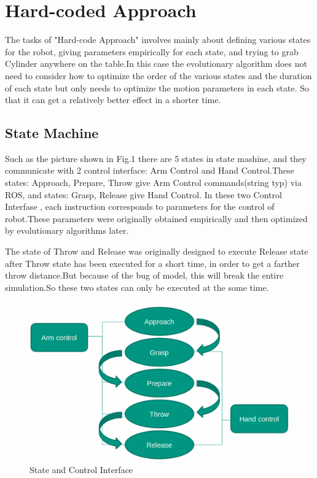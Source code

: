 \section{Hard-coded Approach}

The tasks of "Hard-code Approach" involves mainly about defining various states for the robot, giving parameters empirically for each state, and trying to grab Cylinder anywhere on the table.In this case the evolutionary algorithm does not need to consider how to optimize the order of the various states and the duration of each state but only needs to optimize the motion parameters in each state. So that it can get a relatively better effect in a shorter time.

\subsection{State Machine}

Such as the picture shown in Fig.1 there are 5 states in state mashine, and they communicate with 2 control interface: Arm Control and Hand Control.These states: Approach, Prepare, Throw give Arm Control commands(string typ) via ROS, and states: Grasp, Release give Hand Control. In these two Control Interfase , each instruction corresponds to parameters for the control of robot.These parameters were originally obtained empirically and then optimized by evolutionary algorithms later. 

The state of Throw and Release was originally designed to execute Release state after Throw state has been executed for a short time, in order to get a farther throw distance.But because of the bug of model, this will break the entire simulation.So these two states can only be executed at the some time. 

\begin{figure}[tpb]
\centering
	\includegraphics[width=0.96\linewidth]{figures/1.png} 
	\caption{State and Control Interface}\label{fig:scene}
	\vspace{-0.4cm}
\end{figure}

